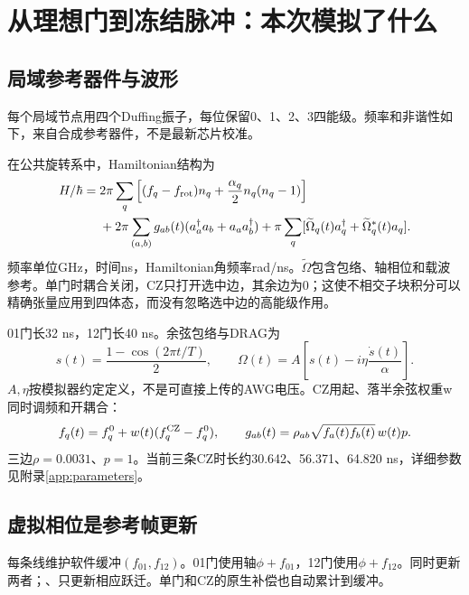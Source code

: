\section{从理想门到冻结脉冲：本次模拟了什么}\label{sec:pulse}
\subsection{局域参考器件与波形}
每个局域节点用四个Duffing振子，每位保留0、1、2、3四能级。频率和非谐性如下，来自合成参考器件，不是最新芯片校准。

在公共旋转系中，Hamiltonian结构为
\begin{equation}\label{eq:hamiltonian}
\begin{aligned}
 H/\hbar={}&2\pi\sum_q\left[(f_q-f_{\rm rot})n_q+\frac{\alpha_q}{2}n_q(n_q-1)\right]\\
 &+2\pi\sum_{(a,b)}g_{ab}(t)(a_a^\dagger a_b+a_a a_b^\dagger)
 +\pi\sum_q[\widetilde\Omega_q(t)a_q^\dagger+\widetilde\Omega_q^*(t)a_q].
\end{aligned}
\end{equation}
频率单位GHz，时间ns，Hamiltonian角频率rad/ns。$\widetilde\Omega$包含包络、轴相位和载波参考。单门时耦合关闭，CZ只打开选中边，其余边为0；这使不相交子块积分可以精确张量应用到四体态，而没有忽略选中边的高能级作用。

01门长32 ns，12门长40 ns。余弦包络与DRAG为
\begin{equation}
 s(t)=\frac{1-\cos(2\pi t/T)}2,\qquad
 \Omega(t)=A\left[s(t)-i\eta\frac{\dot s(t)}{\alpha}\right].
\end{equation}
$A,\eta$按模拟器约定定义，不是可直接上传的AWG电压。CZ用起、落半余弦权重w同时调频和开耦合：
\begin{equation}
 f_q(t)=f_q^0+w(t)(f_q^{\mathrm{CZ}}-f_q^0),\qquad
 g_{ab}(t)=\rho_{ab}\sqrt{f_a(t)f_b(t)}\,w(t)p.
\end{equation}
三边$\rho=0.0031$、$p=1$。当前三条CZ时长约30.642、56.371、64.820 ns，详细参数见附录\ref{app:parameters}。

\subsection{虚拟相位是参考帧更新}
每条线维护软件缓冲$(f_{01},f_{12})$。01门使用轴$\phi+f_{01}$，12门使用$\phi+f_{12}$。同时更新两者；、只更新相应跃迁。单门和CZ的原生补偿也自动累计到缓冲。

